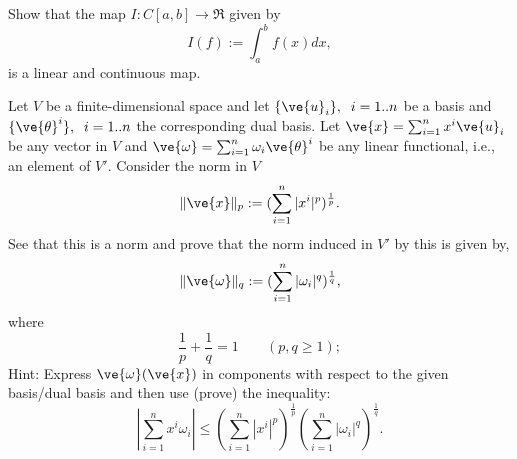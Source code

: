 \bpro
Show that the map $I:C[a,b] \to \Re$ given by 
\begin{equation}
  \label{eq:mapa_integral}
  I(f) := \int_a^b f(x)dx,
\end{equation}
is a linear and continuous map.
\epro

\bpro
Let $V$ be a finite-dimensional space and let $\{\ve{u}_i\},\;\;i=1..n$
be a basis and $\{\ve{\theta}^i\},\;\;i=1..n$ the corresponding dual basis.
Let $\ve{x} = \sum_{i=1}^n x^i \ve{u}_i$ be any vector in $V$ and
$\ve{\omega} = \sum_{i=1}^n \omega_i \ve{\theta}^i$ 
be any linear functional,
i.e., an element of $V'$. 
Consider the norm in $V$
\begin{equation}
  \label{eq:norma_p}
  \|\ve{x}\|_p := (\sum_{i=1}^n |x^i|^p)^{\frac{1}{p}}.
\end{equation}
See that this is a norm and prove that
the norm induced in $V'$ by this is given by,
\begin{equation}
  \label{eq:norma_q}
  \|\ve{\omega}\|_q := (\sum_{i=1}^n |\omega_i|^q)^{\frac{1}{q}},
\end{equation}
%
where 
\begin{equation}
  \label{eq:relacion_p_q}
  \frac{1}{p} + \frac{1}{q} = 1\;\;\;\;\;\;\; (p,q \geq 1);
\end{equation}
%
Hint: Express $\ve{\omega}(\ve{x})$ in components with respect to the 
given basis/dual basis and then use (prove) the inequality:
\begin{equation}
  \label{eq:holder}
  |\sum_{i=1}^{n} x^i \omega_i | \leq 
        (\sum_{i=1}^n |x^i|^p)^{\frac{1}{p}} 
        (\sum_{i=1}^n |\omega_i|^q)^{\frac{1}{q}}.
\end{equation}

\epro


